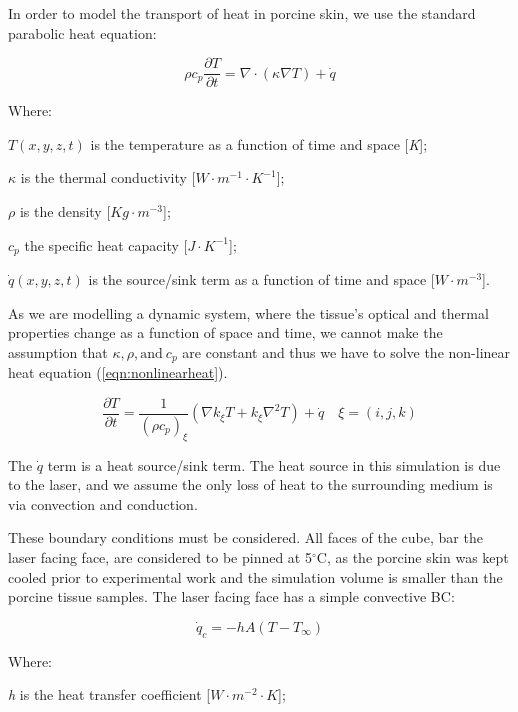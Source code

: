 In order to model the transport of heat in porcine skin, we use the standard parabolic heat equation:

\begin{equation}
\rho c_p \frac{\partial T}{\partial t}= \nabla \cdot (\kappa \nabla T) + \dot{q}
\label{eqn:heat}
\end{equation}

\noindent Where:

	\indent $T(x, y, z, t)$ is the temperature as a function of time and space [\textit{K}];
	
	\indent $\kappa$ is the thermal conductivity [$W\cdot m^{-1}\cdot K^{-1}$];
	
	\indent $\rho$ is the density [$Kg \cdot m^{-3}$];
	
	\indent $c_p$ the specific heat capacity [$J\cdot K^{-1}$];
	
	\indent $\dot{q}(x,y,z,t)$ is the source/sink term as a function of time and space [$W\cdot m^{-3}$].
	
	\medskip

As we are modelling a dynamic system, where the tissue's optical and thermal properties change as a function of space and time, we cannot make the assumption that $\kappa, \rho, \text{and}\  c_p$ are constant and thus we have to solve the non-linear heat equation (\cref{eqn:nonlinearheat}).

\begin{equation}
\frac{\partial T}{\partial t} = \frac{1}{(\rho c_p)_{\xi}}(\nabla k_\xi T + k_\xi\nabla^2T)+\dot{q}\quad \xi=(i,j,k)
\label{eqn:nonlinearheat}
\end{equation}

The $\dot{q}$ term is a heat source/sink term. The heat source in this simulation is due to the laser, and we assume the only loss of heat to the surrounding medium is via convection and conduction.
	
These boundary conditions must be considered. All faces of the cube, bar the laser facing face, are considered to be pinned at 5$^{\circ}$C, as the porcine skin was kept cooled prior to experimental work and the simulation volume is smaller than the porcine tissue samples. The laser facing face has a simple convective BC:	

\begin{equation}
\dot{q}_c = -hA(T - T_\infty)
\label{eqn:bceqns}
\end{equation}

\noindent Where:

	\indent \textit{h} is the heat transfer coefficient [$W\cdot m^{-2}\cdot K$];
	

